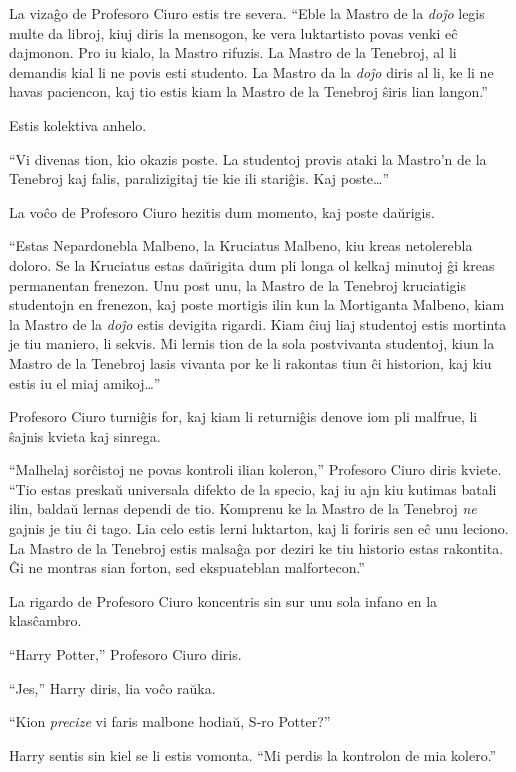 La vizaĝo de Profesoro Ciuro estis tre severa. ``Eble la Mastro de la
\emph{doĵo} legis multe da libroj, kiuj diris la mensogon, ke vera
luktartisto povas venki eĉ dajmonon. Pro iu kialo, la Mastro
rifuzis. La Mastro de la Tenebroj, al li demandis kial li ne povis
esti studento. La Mastro da la \emph{doĵo} diris al li, ke li ne havas
paciencon, kaj tio estis kiam la Mastro de la Tenebroj ŝiris lian
langon.''

Estis kolektiva anhelo.

``Vi divenas tion, kio okazis poste. La studentoj provis ataki la
Mastro'n de la Tenebroj kaj falis, paralizigitaj tie kie ili
stariĝis. Kaj poste\ldots''

La voĉo de Profesoro Ciuro hezitis dum momento, kaj poste daŭrigis.

``Estas Nepardonebla Malbeno, la Kruciatus Malbeno, kiu kreas
netolerebla doloro. Se la Kruciatus estas daŭrigita dum pli longa ol
kelkaj minutoj ĝi kreas permanentan frenezon. Unu post unu, la Mastro de
la Tenebroj kruciatigis studentojn en frenezon, kaj poste mortigis ilin
kun la Mortiganta Malbeno, kiam la Mastro de la \emph{doĵo} estis
devigita rigardi. Kiam ĉiuj liaj studentoj estis mortinta je tiu
maniero, li sekvis. Mi lernis tion de la sola postvivanta studentoj,
kiun la Mastro de la Tenebroj lasis vivanta por ke li rakontas tiun ĉi
historion, kaj kiu estis iu el miaj amikoj\ldots''

Profesoro Ciuro turniĝis for, kaj kiam li returniĝis denove iom pli
malfrue, li ŝajnis kvieta kaj sinrega.

``Malhelaj sorĉistoj ne povas kontroli ilian koleron,'' Profesoro
Ciuro diris kviete. ``Tio estas preskaŭ universala difekto de la
specio, kaj iu ajn kiu kutimas batali ilin, baldaŭ lernas dependi de
tio. Komprenu ke la Mastro de la Tenebroj \emph{ne} gajnis je tiu ĉi
tago. Lia celo estis lerni luktarton, kaj li foriris sen eĉ unu
leciono. La Mastro de la Tenebroj estis malsaĝa por deziri ke tiu
historio estas rakontita. Ĝi ne montras sian forton, sed ekspuateblan
malfortecon.''

La rigardo de Profesoro Ciuro koncentris sin sur unu sola infano en la klasĉambro.

``Harry Potter,'' Profesoro Ciuro diris.

``Jes,'' Harry diris, lia voĉo raŭka.

``Kion \emph{precize} vi faris malbone hodiaŭ, S-ro Potter?''

Harry sentis sin kiel se li estis vomonta. ``Mi perdis la kontrolon de
mia kolero.''

